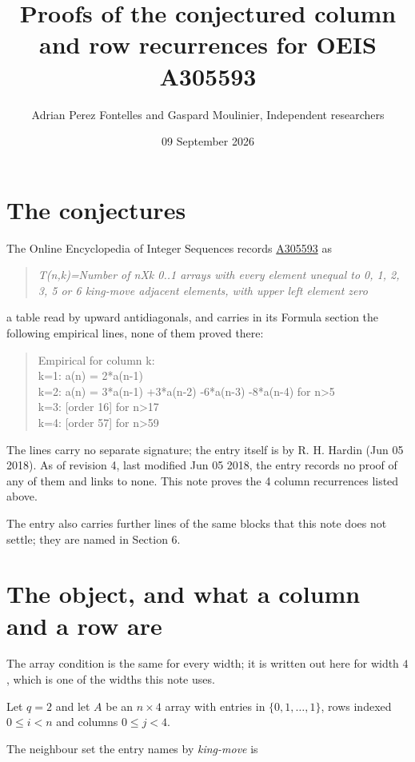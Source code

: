 \documentclass[11pt]{article}
\title{Proofs of the conjectured column and row recurrences for OEIS A305593}
\author{Adrian Perez Fontelles and Gaspard Moulinier, Independent researchers}
\date{09 September 2026}
\theoremstyle{definition}
\begin{document}
\maketitle
\section{The conjectures}

The Online Encyclopedia of Integer Sequences records \href{https://oeis.org/A305593}{A305593} as

\begin{quote}\itshape T(n,k)=Number of nXk 0..1 arrays with every element unequal to 0, 1, 2, 3, 5 or 6 king-move adjacent elements, with upper left element zero\end{quote}

a table read by upward antidiagonals, and carries in its Formula section the following empirical lines, none of them proved there:

\begin{quote}\ttfamily Empirical for column k:\\
k=1: a(n) = 2*a(n-1)\\k=2: a(n) = 3*a(n-1) +3*a(n-2) -6*a(n-3) -8*a(n-4) for n>5\\k=3: [order 16] for n>17\\k=4: [order 57] for n>59\end{quote}

The lines carry no separate signature; the entry itself is by R. H. Hardin (Jun 05 2018). As of revision 4, last modified Jun 05 2018, the entry records no proof of any of them and links to none. This note proves the 4 column recurrences listed above.

The entry also carries further lines of the same blocks that this note does not settle; they are named in Section 6.

\section{The object, and what a column and a row are}

The array condition is the same for every width; it is written out here for width $4$, which is one of the widths this note uses.

Let $q = 2$ and let $A$ be an $n \times 4$ array with entries in $\{0,1,\dots,1\}$, rows indexed $0 \le i < n$ and columns $0 \le j < 4$.

The neighbour set the entry names by {\itshape king-move} is
\end{document}
